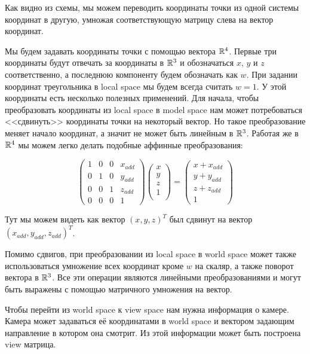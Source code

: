 \documentclass{article}
\begin{document}
Как видно из схемы, мы можем переводить координаты 
точки из одной системы координат в другую, умножая 
соответствующую матрицу слева на вектор координат.

Мы будем задавать координаты точки с помощью вектора 
$\mathbb{R}^4$. Первые три координаты будут отвечать за координаты в 
$\mathbb{R}^3$ и обозначаться $x$, $y$ и $z$ соответственно, а 
последнюю компоненту будем обозначать как $w$. При задании 
координат треугольника в local space мы будем всегда считать 
$w=1$. У этой координаты есть несколько полезных применений. 
Для начала, чтобы преобразовать координаты из local space в 
model space нам может потребоваться <<сдвинуть>> координаты точки на 
некоторый вектор. Но такое преобразование меняет начало координат, а 
значит не может быть линейным в $\mathbb{R}^3$. Работая же в 
$\mathbb{R}^4$ мы можем легко делать подобные аффинные преобразования:

\[
    \begin{pmatrix}
        1 & 0 & 0 & x_{add}\\
        0 & 1 & 0 & y_{add}\\
        0 & 0 & 1 & z_{add}\\
        0 & 0 & 0 & 1
    \end{pmatrix}
    \begin{pmatrix}
        x\\ y\\ z\\ 1\\
    \end{pmatrix} = 
    \begin{pmatrix}
        x + x_{add}\\
        y + y_{add}\\
        z + z_{add}\\
        1
    \end{pmatrix}
\]

Тут мы можем видеть как вектор $(x, y, z)^T$ был 
сдвинут на вектор $(x_{add}, y_{add}, z_{add})^T$.

Помимо сдвигов, при преобразовании из local space в 
world space может также использоваться умножение всех 
координат кроме $w$ на скаляр, а также поворот вектора 
в $\mathbb{R}^3$. Все эти операции являются линейными преобразованиями 
и могут быть выражены с помощью матричного умножения на вектор.

Чтобы перейти из world space к view space нам нужна 
информация о камере. Камера может задаваться её координатами 
в world space и вектором задающим направление в котором 
она смотрит. Из этой информации может быть 
построена view матрица. 
\end{document}
